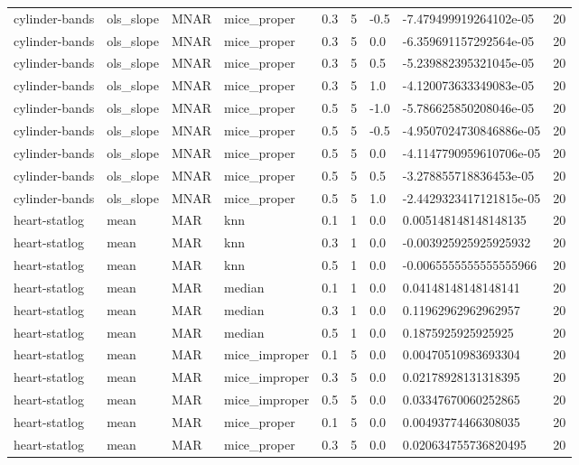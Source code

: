 \begin{tabular}{lllllllll}
cylinder-bands & ols\_slope & MNAR & mice\_proper & 0.3 & 5 & -0.5 & -7.479499919264102e-05 & 20 \\
cylinder-bands & ols\_slope & MNAR & mice\_proper & 0.3 & 5 & 0.0 & -6.359691157292564e-05 & 20 \\
cylinder-bands & ols\_slope & MNAR & mice\_proper & 0.3 & 5 & 0.5 & -5.239882395321045e-05 & 20 \\
cylinder-bands & ols\_slope & MNAR & mice\_proper & 0.3 & 5 & 1.0 & -4.120073633349083e-05 & 20 \\
cylinder-bands & ols\_slope & MNAR & mice\_proper & 0.5 & 5 & -1.0 & -5.786625850208046e-05 & 20 \\
cylinder-bands & ols\_slope & MNAR & mice\_proper & 0.5 & 5 & -0.5 & -4.9507024730846886e-05 & 20 \\
cylinder-bands & ols\_slope & MNAR & mice\_proper & 0.5 & 5 & 0.0 & -4.1147790959610706e-05 & 20 \\
cylinder-bands & ols\_slope & MNAR & mice\_proper & 0.5 & 5 & 0.5 & -3.278855718836453e-05 & 20 \\
cylinder-bands & ols\_slope & MNAR & mice\_proper & 0.5 & 5 & 1.0 & -2.4429323417121815e-05 & 20 \\
heart-statlog & mean & MAR & knn & 0.1 & 1 & 0.0 & 0.005148148148148135 & 20 \\
heart-statlog & mean & MAR & knn & 0.3 & 1 & 0.0 & -0.003925925925925932 & 20 \\
heart-statlog & mean & MAR & knn & 0.5 & 1 & 0.0 & -0.0065555555555555966 & 20 \\
heart-statlog & mean & MAR & median & 0.1 & 1 & 0.0 & 0.04148148148148141 & 20 \\
heart-statlog & mean & MAR & median & 0.3 & 1 & 0.0 & 0.11962962962962957 & 20 \\
heart-statlog & mean & MAR & median & 0.5 & 1 & 0.0 & 0.1875925925925925 & 20 \\
heart-statlog & mean & MAR & mice\_improper & 0.1 & 5 & 0.0 & 0.00470510983693304 & 20 \\
heart-statlog & mean & MAR & mice\_improper & 0.3 & 5 & 0.0 & 0.02178928131318395 & 20 \\
heart-statlog & mean & MAR & mice\_improper & 0.5 & 5 & 0.0 & 0.03347670060252865 & 20 \\
heart-statlog & mean & MAR & mice\_proper & 0.1 & 5 & 0.0 & 0.00493774466308035 & 20 \\
heart-statlog & mean & MAR & mice\_proper & 0.3 & 5 & 0.0 & 0.020634755736820495 & 20 \\

\end{tabular}

